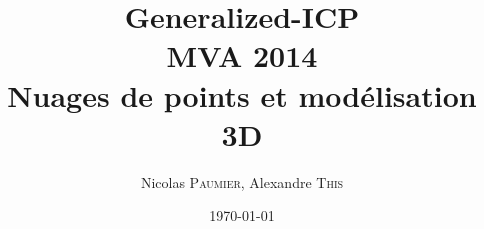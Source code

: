 \documentclass{article}
\title{Generalized-ICP \\MVA 2014 \\ Nuages de points et modélisation 3D } %
\author{Nicolas \textsc{Paumier}, Alexandre \textsc{This}} %
\date{\today} %
\begin{document}
\maketitle %



\setlength\parindent{0pt} %

\renewcommand{\labelenumi}{\alph{enumi}.} %

\tableofcontents

\newpage





\appendix

\newpage


\end{document}
